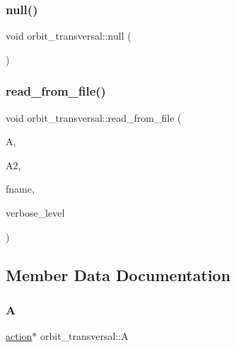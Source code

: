 \mbox{\label{classorbit__transversal_a8bd5bcab670558a096b18232558dfeae}} 
\subsubsection{\texorpdfstring{null()}{null()}}
{\footnotesize\ttfamily void orbit\+\_\+transversal\+::null (\begin{DoxyParamCaption}{ }\end{DoxyParamCaption})}

\mbox{\label{classorbit__transversal_af88293d7cc859b6202547d60a08c6b59}} 
\subsubsection{\texorpdfstring{read\+\_\+from\+\_\+file()}{read\_from\_file()}}
{\footnotesize\ttfamily void orbit\+\_\+transversal\+::read\+\_\+from\+\_\+file (\begin{DoxyParamCaption}\item[{\mbox{\hyperlink{classaction}{action}} $\ast$}]{A,  }\item[{\mbox{\hyperlink{classaction}{action}} $\ast$}]{A2,  }\item[{const \mbox{\hyperlink{galois_8h_ab6cc7b4aeb6ea31aba2b3fbfc83ff5e6}{B\+Y\+TE}} $\ast$}]{fname,  }\item[{\mbox{\hyperlink{galois_8h_a09fddde158a3a20bd2dcadb609de11dc}{I\+NT}}}]{verbose\+\_\+level }\end{DoxyParamCaption})}



\subsection{Member Data Documentation}
\mbox{\label{classorbit__transversal_a28099358f8a7e1b4913ab8b2e39a7323}} 
\subsubsection{\texorpdfstring{A}{A}}
{\footnotesize\ttfamily \mbox{\hyperlink{classaction}{action}}$\ast$ orbit\+\_\+transversal\+::A}

